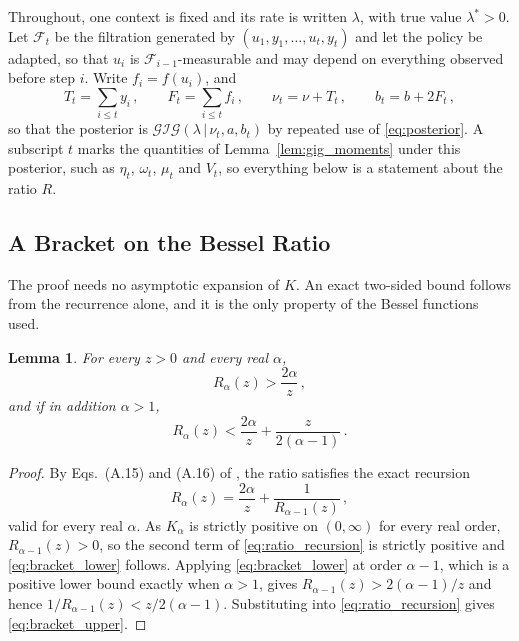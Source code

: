 \documentclass[twoside]{article}
\newcommand\given[1][]{\,#1\vert\,}
\providecommand{\Gig}{\mathcal{GIG}}  %
\theoremstyle{plain}
\newtheorem{lemma}{Lemma}
\theoremstyle{definition}
\theoremstyle{remark}
\begin{document}
Throughout, one context is fixed and its rate is written $\lambda$, with true value $\lambda^{*} > 0$.
Let $\mathcal{F}_{t}$ be the filtration generated by $(u_1, y_1, \dots, u_t, y_t)$ and let the policy be adapted, so that $u_{i}$ is $\mathcal{F}_{i-1}$-measurable and may depend on everything observed before step $i$.
Write $f_i = f(u_i)$, and
%
\begin{equation*}
    T_t = \sum_{i \leq t} y_i \,, \qquad F_t = \sum_{i \leq t} f_i \,, \qquad \nu_t = \nu + T_t \,, \qquad b_t = b + 2 F_t \,,
\end{equation*}
%
so that the posterior is $\Gig(\lambda \given \nu_t, a, b_t)$ by repeated use of \eqref{eq:posterior}.
A subscript $t$ marks the quantities of Lemma~\ref{lem:gig_moments} under this posterior, such as $\eta_t$, $\omega_t$, $\mu_t$ and $V_t$, so everything below is a statement about the ratio $R$.

\subsection{A Bracket on the Bessel Ratio}

The proof needs no asymptotic expansion of $K$.
An exact two-sided bound follows from the recurrence alone, and it is the only property of the Bessel functions used.

\begin{lemma}
    \label{lem:bessel_bracket}
    For every $z > 0$ and every real $\alpha$,
    \begin{equation}
        R_{\alpha}(z) > \frac{2\alpha}{z} \,,
        \label{eq:bracket_lower}
    \end{equation}
    and if in addition $\alpha > 1$,
    \begin{equation}
        R_{\alpha}(z) < \frac{2\alpha}{z} + \frac{z}{2(\alpha - 1)} \,.
        \label{eq:bracket_upper}
    \end{equation}
\end{lemma}

\begin{proof}
    By Eqs.~(A.15) and (A.16) of \citet{jorgensen1982statistical}, the ratio satisfies the exact recursion
    \begin{equation}
        R_{\alpha}(z) = \frac{2\alpha}{z} + \frac{1}{R_{\alpha - 1}(z)} \,,
        \label{eq:ratio_recursion}
    \end{equation}
    valid for every real $\alpha$.
    As $K_{\alpha}$ is strictly positive on $(0, \infty)$ for every real order, $R_{\alpha - 1}(z) > 0$, so the second term of \eqref{eq:ratio_recursion} is strictly positive and \eqref{eq:bracket_lower} follows.
    Applying \eqref{eq:bracket_lower} at order $\alpha - 1$, which is a positive lower bound exactly when $\alpha > 1$, gives $R_{\alpha - 1}(z) > 2(\alpha - 1)/z$ and hence $1/R_{\alpha - 1}(z) < z / 2(\alpha - 1)$.
    Substituting into \eqref{eq:ratio_recursion} gives \eqref{eq:bracket_upper}.
\end{proof}
\end{document}
